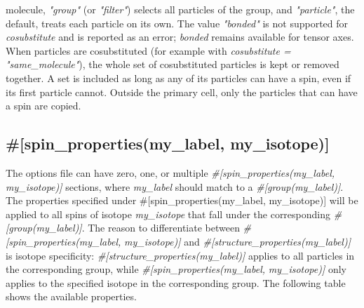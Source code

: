 \documentclass{book}
\begin{document}
molecule, \textit{"group"} (or \textit{"filter"}) selects all particles of 
the group, and \textit{"particle"}, the default, treats each particle on 
its own.
The value \textit{"bonded"} is not supported for \textit{cosubstitute} and
is reported as an error; \textit{bonded} remains available for tensor axes.
When particles are cosubstituted (for example with 
\textit{cosubstitute = "same\_molecule"}),
the whole set of cosubstituted particles is kept or removed together.
A set is included as long as any of its particles can have a spin, 
even if its first particle cannot.
Outside the primary cell, only the particles that can have a spin are copied.

\subsection{\#[spin\_properties(my\_label, my\_isotope)]}
The options file can have zero, one, or multiple 
\textit{\#[spin\_properties(my\_label, my\_isotope)]} 
sections, where \textit{my\_label} should match to a 
\textit{\#[group(my\_label)]}.
The properties specified under  
{\#[spin\_properties(my\_label, my\_isotope)]} will be applied
to all spins of isotope \textit{my\_isotope} that fall under the corresponding
\textit{\#[group(my\_label)]}.
The reason to differentiate between 
\textit{\#[spin\_properties(my\_label, }
\textit{my\_isotope)]}
and \textit{\#[structure\_properties(my\_label)]}
is isotope specificity:
\textit{\#[structure\_properties(my\_label)]} applies to all
particles in the corresponding group, while 
\textit{\#[spin\_properties(my\_label, }
\textit{my\_isotope)]}
only applies to the specified isotope in the corresponding group.
The following table shows the available properties.
\end{document}
